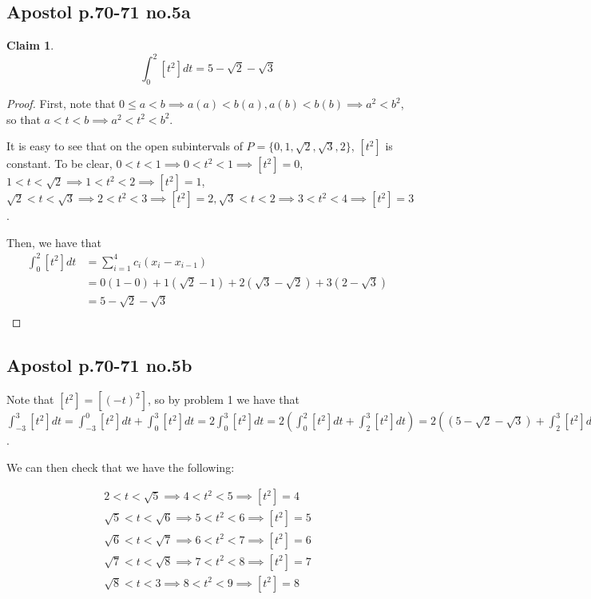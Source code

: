 \documentclass[12pt,letterpaper]{article}
\theoremstyle{definition}
\newtheorem*{claim}{Claim}
\begin{document}
\subsection*{Apostol p.70-71 no.5a}

\begin{claim}
  $$\int_0^2[t^2]dt = 5 - \sqrt{2} - \sqrt{3}$$
\end{claim}

\begin{proof}
  First, note that $0 \leq a < b \implies a(a) < b(a), a(b) < b(b) \implies a^2 < b^2$,
  so that $a < t < b \implies a^2 < t^2 < b^2$.

  It is easy to see that on the open subintervals of $P = \{0, 1, \sqrt{2},
  \sqrt{3}, 2\}$, $[t^2]$ is constant. To be clear, $0 < t < 1 \implies 0 < t^2
  < 1 \implies [t^2] = 0$, $1 < t < \sqrt{2} \implies 1 < t^2 < 2 \implies [t^2]
  = 1$, $\sqrt{2} < t < \sqrt{3} \implies 2 < t^2 < 3 \implies [t^2] = 2, \sqrt{3} < t <
  2 \implies 3 < t^2 < 4 \implies [t^2] = 3$. 

  Then, we have that
  \begin{align*}
    \int_0^2[t^2]dt &= \sum_{i=1}^4 c_i(x_i - x_{i-1}) \\
                    &= 0(1 - 0) + 1(\sqrt{2} - 1) + 2(\sqrt{3} - \sqrt{2}) + 3(2 - \sqrt{3}) \\
                    &= 5 - \sqrt{2} - \sqrt{3} \\
  \end{align*}
\end{proof}

\subsection*{Apostol p.70-71 no.5b}

Note that $[t^2] = [(-t)^2]$, so by problem 1 we have that $\int_{-3}^3 [t^2]dt
= \int_{-3}^{0}[t^2]dt + \int_0^3[t^2]dt = 2\int_0^3[t^2]dt = 2(\int_0^2[t^2]dt
+ \int_2^3[t^2]dt) = 2((5 - \sqrt{2} -\sqrt{3}) + \int_2^3[t^2]dt)$.

We can then check that we have the following:

\begin{align*}
  2 < t < \sqrt{5} \implies 4 < t^2 < 5 \implies [t^2] = 4 \\
  \sqrt{5} < t < \sqrt{6} \implies 5 < t^2 < 6 \implies [t^2] = 5 \\
  \sqrt{6} < t < \sqrt{7} \implies 6 < t^2 < 7 \implies [t^2] = 6 \\
  \sqrt{7} < t < \sqrt{8} \implies 7 < t^2 < 8 \implies [t^2] = 7 \\
  \sqrt{8} < t < 3 \implies 8 < t^2 < 9 \implies [t^2] = 8 \\
\end{align*}
\end{document}
